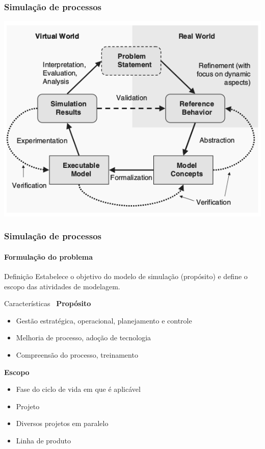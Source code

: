 \begin{frame}[hasnext=true, hasprev=true]
	\frametitle{Simulação de processos}

	\begin{block:fact}{}
		\includegraphics[width=\textwidth]{simulation-modeling-aspects}
		\cite{Muller-Pfahl:2008}
	\end{block:fact}
\end{frame}


\begin{frame}
	\frametitle{Simulação de processos}
	\framesubtitle{Formulação do problema}
	
	\begin{block:concept}{Definição}
		Estabelece o objetivo do modelo de simulação (propósito) e define o escopo
		das atividades de modelagem.
	\end{block:concept}
	
	\begin{block:concept}{Características~\cite{Kelner-etal:1999}}
		\textbf{Propósito}
		\begin{itemize}
			\item Gestão estratégica, operacional, planejamento e controle
			\item Melhoria de processo, adoção de tecnologia
			\item Compreensão do processo, treinamento
		\end{itemize}
		
		\textbf{Escopo}
		\begin{itemize}
			\item Fase do ciclo de vida em que é aplicável
			\item Projeto
			\item Diversos projetos em paralelo
			\item Linha de produto
		\end{itemize}
	\end{block:concept}
\end{frame}


